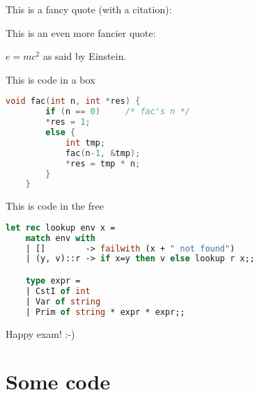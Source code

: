 \documentclass{ituhandin}
\begin{document}
%
\maketitlepage
\signpage

\question{}

This is a fancy quote (with a citation):

This is an even more fancier quote:

$e=mc^2$ as said by Einstein\cite{einstein}.

This is code in a box

\begin{lstlisting}[language=C, caption=This is a caption]
    void fac(int n, int *res) {
        if (n == 0)     /* fac's n */
        *res = 1;
        else {
            int tmp;
            fac(n-1, &tmp);
            *res = tmp * n;
        }
    }
\end{lstlisting}


This is code in the free

\begin{lstlisting}[language=ML, frame={}]
    let rec lookup env x =
    match env with 
    | []        -> failwith (x + " not found")
    | (y, v)::r -> if x=y then v else lookup r x;;

    type expr = 
    | CstI of int
    | Var of string
    | Prim of string * expr * expr;;
\end{lstlisting}


Happy exam! :-)


\question{}
\section{}
\section{}




\appendix
\chapter{Some code}

\label{LastPage}
\end{document}
